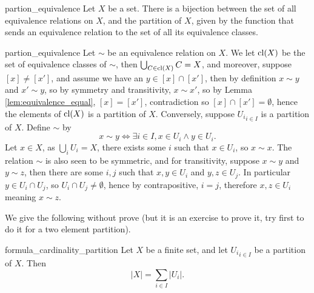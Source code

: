 \begin{cprop}{}{partion_equivalence}
    Let \( X \) be a set. There is a bijection between the set of all equivalence relations on \( X \), and the partition of \( X \), given by the function that sends an equivalence relation to the set of all its equivalence classes.
\end{cprop}
\begin{propproof}{partion_equivalence}
    Let \( \sim \) be an equivalence relation on \( X \). We let \( \operatorname{cl}(X) \) be the set of equivalence classes of \( \sim \), then \( \bigcup_{C \in \operatorname{cl}(X)} C = X\), and moreover, suppose \( [x] \neq [x'] \), and assume we have an \( y \in [x] \cap [x'] \), then by definition \( x \sim y \) and \( x' \sim y \), so by symmetry and transitivity, \( x \sim x' \), so by Lemma \ref{lem:equivalence_equal}, \( [x] = [x'] \), contradiction so \( [x] \cap [x'] = \emptyset \), hence the elements of \( \operatorname{cl}(X) \) is a partition of \( X \). Conversely, suppose \( {U_i}_{i \in I} \) is a partition of \( X \). Define \( \sim \) by
    \begin{equation*}
        x \sim y \iff \exists i \in I, x \in U_i \land y \in U_i. 
    \end{equation*}
    Let \( x \in X \), as \( \bigcup_i U_i = X \), there exists some \( i \) such that \( x \in U_i \), so \( x \sim x \). The relation \( \sim \) is also seen to be symmetric, and for transitivity, suppose \( x \sim y \) and \( y \sim z \), then there are some \( i, j \) such that \( x, y \in U_i \) and \( y, z \in U_j \). In particular \( y \in U_i \cap U_j \), so \( U_i \cap U_j \neq \emptyset \), hence by contrapositive, \( i = j \), therefore \( x, z \in U_i \) meaning \( x \sim z \).
\end{propproof}

We give the following without prove (but it is an exercise to prove it, try first to do it for a two element partition).
\begin{cprop}{}{formula_cardinality_partition}
    Let \( X \) be a finite set, and let \( {U_i}_{i\in I} \) be a partition of \( X \). Then
    \begin{equation*}
        |X| = \sum\limits_{i \in I} |U_i|.
    \end{equation*}
\end{cprop}


